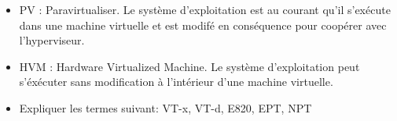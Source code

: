 \begin{correction}

\begin{itemize}
\item PV : Paravirtualiser. Le syst\`eme d'exploitation est au courant qu'il s'ex\'ecute dans une machine virtuelle et est modif\'e en cons\'equence pour coop\'erer avec l'hyperviseur.
\item HVM : Hardware Virtualized Machine. Le syst\`eme d'exploitation peut s'\'ex\'ecuter sans modification \`a l'int\'erieur d'une machine virtuelle.
\end{itemize}

\end{correction}

\begin{itemize}
\item Expliquer les termes suivant: VT-x, VT-d, E820, EPT, NPT
\end{itemize}


